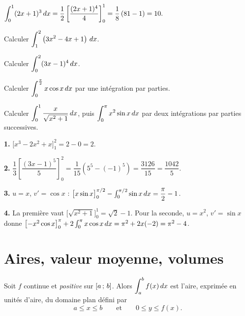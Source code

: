 \begin{exemple}
$\displaystyle\int_{0}^{1} (2x+1)^{3}\,dx
= \frac{1}{2}\left[\frac{(2x+1)^{4}}{4}\right]_{0}^{1}
= \frac{1}{8}\left(81-1\right) = 10 .$
\end{exemple}

\begin{entrainement}
\exo[\niveau{1}] Calculer $\displaystyle\int_{1}^{2}\left(3x^{2}-4x+1\right)\,dx$.

\exo[\niveau{1}] Calculer $\displaystyle\int_{0}^{2} (3x-1)^{4}\,dx$.

\exo[\niveau{2}] Calculer $\displaystyle\int_{0}^{\frac{\pi}{2}} x\cos x \,dx$
par une intégration par parties.

\exo[\niveau{3}] Calculer $\displaystyle\int_{0}^{1} \frac{x}{\sqrt{x^{2}+1}}\,dx$,
puis $\displaystyle\int_{0}^{\pi} x^{2}\sin x\,dx$ par deux intégrations par
parties successives.
\end{entrainement}

\begin{corrige}
\textbf{1.} $\bigl[x^{3}-2x^{2}+x\bigr]_{1}^{2} = 2-0 = 2$.

\textbf{2.} $\dfrac{1}{3}\left[\dfrac{(3x-1)^{5}}{5}\right]_{0}^{2}
= \dfrac{1}{15}\left(5^{5}-(-1)^{5}\right) = \dfrac{3126}{15} = \dfrac{1042}{5}$.

\textbf{3.} $u=x$, $v'=\cos x$ : $\bigl[x\sin x\bigr]_{0}^{\pi/2}
- \int_{0}^{\pi/2}\sin x\,dx = \dfrac{\pi}{2} - 1$.

\textbf{4.} La première vaut $\bigl[\sqrt{x^{2}+1}\bigr]_{0}^{1} = \sqrt2 - 1$.
Pour la seconde, $u = x^{2}$, $v' = \sin x$ donne
$\bigl[-x^{2}\cos x\bigr]_{0}^{\pi} + 2\int_{0}^{\pi} x\cos x\,dx
= \pi^{2} + 2 x (-2) = \pi^{2}-4$.
\end{corrige}

\section{Aires, valeur moyenne, volumes}

\begin{theoreme}
Soit $f$ continue et \emph{positive} sur $\left[a\,;\,b\right]$. Alors
$\displaystyle\int_{a}^{b} f(x)\,dx$ est l'aire, exprimée en unités d'aire, du
domaine plan défini par
\[
  a \leq x \leq b \qquad \text{et} \qquad 0 \leq y \leq f(x).
\]
\end{theoreme}

